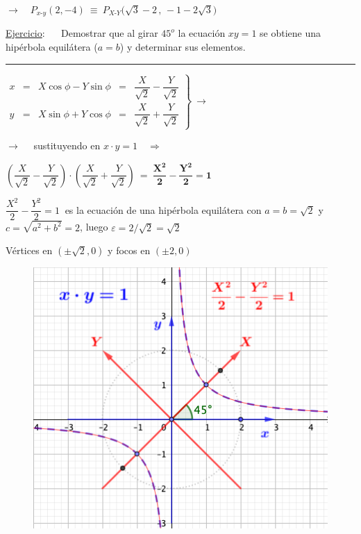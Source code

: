 $\to \quad  P_{x\text{-}y}(2,-4) \ \equiv \ P_{X\text{-}Y} \big(\sqrt{3}-2 \, , \, -1-2\sqrt{3} \big)$


\vspace{5mm}
\vspace{2mm} \underline{Ejercicio}: $\quad$ Demostrar que al girar $45^o$ la ecuación $xy=1$ se obtiene una hipérbola equilátera \textcolor{gris}{($a=b$)} y determinar sus elementos.


\rule{200pt}{0.1pt}


\begin{multicols}{2}

$\left. \begin{array}{lclcl}
x&=&X\cos \phi-Y\sin \phi&=&\dfrac{X}{\sqrt{2}}-\dfrac{Y}{\sqrt{2}} \\ y&=&X\sin \phi+Y\cos \phi&=& \dfrac{X}{\sqrt{2}}+\dfrac{Y}{\sqrt{2}} \end{array}   \right\} \ \to$

\vspace{2mm} $\to \quad $ sustituyendo en $x\cdot y=1 \quad \Rightarrow$

\vspace{2mm} $ \left( \dfrac{X}{\sqrt{2}}-\dfrac{Y}{\sqrt{2}} \right) \cdot \left( \dfrac{X}{\sqrt{2}}+\dfrac{Y}{\sqrt{2}} \right) \ = \ \boldsymbol{ \dfrac{X^2}{2}-\dfrac{Y^2}{2} = 1 }$


\vspace{4mm} $\dfrac{X^2}{2}-\dfrac{Y^2}{2} = 1 \ $ es la ecuación de una hipérbola equilátera con $a=b=\sqrt{2}$ y $c=\sqrt{a^2+b^2}=2$, luego $\varepsilon = 2/\sqrt{2}=\sqrt{2}$

\vspace{2mm} Vértices en $(\pm \sqrt{2}, 0)$ y focos en $(\pm 2,0)$
\begin{figure}[H]
	\centering
	\includegraphics[width=.5\textwidth]{img-conicas/conicas51.png}
	\end{figure}		
\end{multicols}


